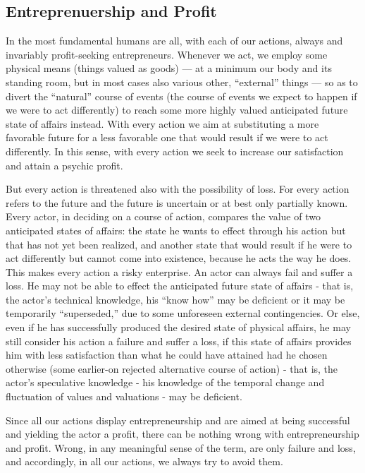 \subsection{Entreprenuership and Profit}

In the most fundamental humans are all, with each of our actions, always and invariably profit-seeking entrepreneurs. Whenever we act, we employ some physical means (things valued as goods) — at a minimum our body and its standing room, but in most cases also various other, ``external'' things — so as to divert the ``natural'' course of events (the course of events we expect to happen if we were to act differently) to reach some more highly valued anticipated future state of affairs instead. With every action we aim at substituting a more favorable future for a less favorable one that would result if we were to act differently. In this sense, with every action we seek to increase our satisfaction and attain a psychic profit.

But every action is threatened also with the possibility of loss. For every action refers to the future and the future is uncertain or at best only partially known. Every actor, in deciding on a course of action, compares the value of two anticipated states of affairs: the state he wants to effect through his action but that has not yet been realized, and another state that would result if he were to act differently but cannot come into existence, because he acts the way he does. This makes every action a risky enterprise. An actor can always fail and suffer a loss. He may not be able to effect the anticipated future state of affairs - that is, the actor’s technical knowledge, his ``know how'' may be deficient or it may be temporarily ``superseded,'' due to some unforeseen external contingencies. Or else, even if he has successfully produced the desired state of physical affairs, he may still consider his action a failure and suffer a loss, if this state of affairs provides him with less satisfaction than what he could have attained had he chosen otherwise (some earlier-on rejected alternative course of action) - that is, the actor’s speculative knowledge - his knowledge of the temporal change and fluctuation of values and valuations - may be deficient.

Since all our actions display entrepreneurship and are aimed at being successful and yielding the actor a profit, there can be nothing wrong with entrepreneurship and profit. Wrong, in any meaningful sense of the term, are only failure and loss, and accordingly, in all our actions, we always try to avoid them.

